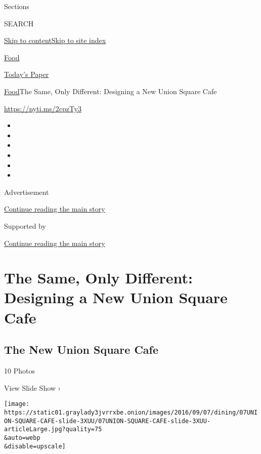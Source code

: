 Sections

SEARCH

\protect\hyperlink{site-content}{Skip to
content}\protect\hyperlink{site-index}{Skip to site index}

\href{https://www.nytimes3xbfgragh.onion/section/food}{Food}

\href{https://myaccount.nytimes3xbfgragh.onion/auth/login?response_type=cookie\&client_id=vi}{}

\href{https://www.nytimes3xbfgragh.onion/section/todayspaper}{Today's
Paper}

\href{/section/food}{Food}\textbar{}The Same, Only Different: Designing
a New Union Square Cafe

\url{https://nyti.ms/2cpzTy3}

\begin{itemize}
\item
\item
\item
\item
\item
\item
\end{itemize}

Advertisement

\protect\hyperlink{after-top}{Continue reading the main story}

Supported by

\protect\hyperlink{after-sponsor}{Continue reading the main story}

\hypertarget{the-same-only-different-designing-a-new-union-square-cafe}{%
\section{The Same, Only Different: Designing a New Union Square
Cafe}\label{the-same-only-different-designing-a-new-union-square-cafe}}

\href{https://www.nytimes3xbfgragh.onion/slideshow/2016/09/07/dining/the-new-union-square-cafe.html}{}

\hypertarget{the-new-union-square-cafe}{%
\subsection{The New Union Square Cafe}\label{the-new-union-square-cafe}}

10 Photos

View Slide Show ›

\texttt{[image: https://static01.graylady3jvrrxbe.onion/images/2016/09/07/dining/07UNION-SQUARE-CAFE-slide-3XUU/07UNION-SQUARE-CAFE-slide-3XUU-articleLarge.jpg?quality=75\\\&auto=webp\\\&disable=upscale]}

